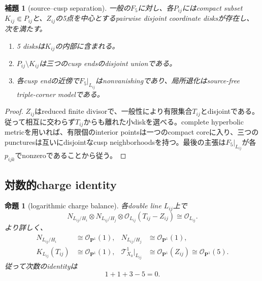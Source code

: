 \documentclass[11pt,a4paper]{ltjsarticle}
\newtheorem{proposition}[theorem]{命題}
\newtheorem{lemma}[theorem]{補題}
\theoremstyle{definition}
\theoremstyle{remark}
\newcommand{\PP}{\mathbf P}
\begin{document}
\begin{lemma}[source--cusp separation]\label{lem:source-cusp-separation}
一般の$F_5$に対し、各$P_{ij}$にはcompact subset $K_{ij}\Subset P_{ij}$と、$Z_{ij}$の5点を中心とするpairwise disjoint coordinate disksが存在し、次を満たす。
\begin{enumerate}[label=(\roman*),leftmargin=2.8em]
\item 5 disksは$K_{ij}$の内部に含まれる。
\item $P_{ij}\setminus K_{ij}$は三つのcusp endsのdisjoint unionである。
\item 各cusp endの近傍で$F_5|_{L_{ij}}$はnonvanishingであり、局所退化はsource-free triple-corner modelである。
\end{enumerate}
\end{lemma}

\begin{proof}
$Z_{ij}$はreduced finite divisorで、一般性により有限集合$T_{ij}$とdisjointである。従って相互に交わらず$T_{ij}$からも離れた小diskを選べる。complete hyperbolic metricを用いれば、有限個のinterior pointsは一つのcompact coreに入り、三つのpuncturesは互いにdisjointなcusp neighborhoodsを持つ。最後の主張は$F_5|_{L_{ij}}$が各$p_{ijk}$でnonzeroであることから従う。
\end{proof}

\subsection{対数的charge identity}

\begin{proposition}[logarithmic charge balance]\label{prop:log-charge}
各double line $L_{ij}$上で
\begin{equation}\label{eq:log-charge-linebundle}
 N_{L_{ij}/H_i}\otimes N_{L_{ij}/H_j}
 \otimes\mathcal O_{L_{ij}}(T_{ij}-Z_{ij})
 \cong\mathcal O_{L_{ij}}.
\end{equation}
より詳しく、
\begin{align}
 N_{L_{ij}/H_i}&\cong\mathcal O_{\PP^1}(1),
 &N_{L_{ij}/H_j}&\cong\mathcal O_{\PP^1}(1),\label{eq:normal-O1}\\
 K_{L_{ij}}(T_{ij})&\cong\mathcal O_{\PP^1}(1),
 &\mathcal T^1_{X_0}|_{L_{ij}}&\cong\mathcal O_{\PP^1}(Z_{ij})\cong\mathcal O_{\PP^1}(5).
\label{eq:log-canonical-match}
\end{align}
従って次数のidentityは
\begin{equation}\label{eq:charge-1135}
 \boxed{1+1+3-5=0.}
\end{equation}
\end{proposition}
\end{document}
